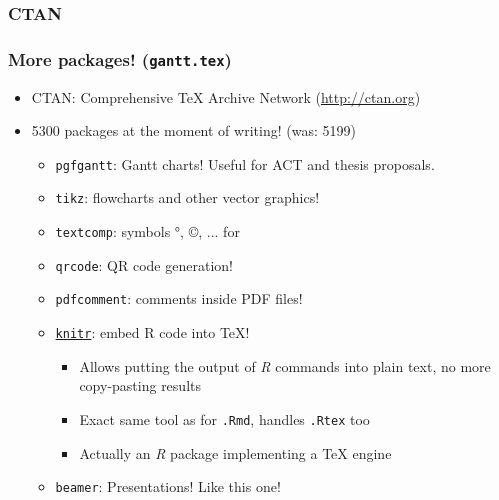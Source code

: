 \documentclass[xetex,colorlinks]{beamer} %
\begin{document}
  \subsubsection{CTAN}
  \begin{frame}
    \frametitle{More packages! (\texttt{gantt.tex})}
    \begin{itemize}
     \item CTAN: Comprehensive \TeX{} Archive Network (\href{http://ctan.org}{http://ctan.org})
     \item 5300 packages at the moment of writing! (was: 5199)
      \begin{itemize}
      \item \texttt{pgfgantt}: Gantt charts! Useful for ACT and thesis proposals.
      \item \texttt{tikz}: flowcharts and other vector graphics!
      \item \texttt{textcomp}: symbols °, ©, ... for 
      \item \texttt{qrcode}: QR code generation!
      \item \texttt{pdfcomment}: comments inside PDF files!
      \item \href{https://github.com/yihui/knitr-examples/blob/master/005-latex.Rtex}{\texttt{knitr}}: embed R code into \TeX{}!
      \begin{itemize}
	\item Allows putting the output of \textit{R} commands into plain text, no more copy-pasting results
	\item Exact same tool as for \texttt{.Rmd}, handles \texttt{.Rtex} too
	\item Actually an \textit{R} package implementing a \TeX{} engine
      \end{itemize}
      \item \texttt{beamer}: Presentations! Like this one!
      \end{itemize}
    \end{itemize}
  \end{frame}
\end{document}
